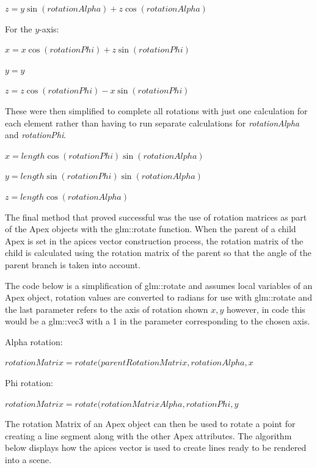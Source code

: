 \documentclass[final]{cmpreport}
\begin{document}
$z = y\sin(rotationAlpha) + z\cos(rotationAlpha)$

For the $y$-axis:

$x = x\cos(rotationPhi) + z\sin(rotationPhi)$

$y = y$

$z = z\cos(rotationPhi) - x\sin(rotationPhi)$

These were then simplified to complete all rotations with just one calculation for each element 
rather than having to run separate calculations for \emph{rotationAlpha} and \emph{rotationPhi}.

$x = length\cos(rotationPhi)\sin(rotationAlpha)$

$y = length\sin(rotationPhi)\sin(rotationAlpha)$

$z = length\cos(rotationAlpha)$

The final method that proved successful was the use of rotation matrices as part of the Apex 
objects with the glm::rotate function. When the parent of a child Apex is set in the apices vector construction process, the 
rotation matrix of the child is calculated using the rotation matrix of the parent so that 
the angle of the parent branch is taken into account. 

The code below is a simplification of glm::rotate and assumes local variables of an 
Apex object, rotation values are converted to radians for use with glm::rotate and the last 
parameter refers to the axis of rotation shown $x, y$ however, in code this would be 
a glm::vec3 with a 1 in the parameter corresponding to the chosen axis.

Alpha rotation:

$rotationMatrix = rotate(parentRotationMatrix, rotationAlpha, x$

Phi rotation:

$rotationMatrix = rotate(rotationMatrixAlpha, rotationPhi, y$

The rotation Matrix of an Apex object can then be used to rotate a point for creating a line 
segment along with the other Apex attributes. The algorithm below displays how the apices 
vector is used to create lines ready to be rendered into a scene.
\end{document}
